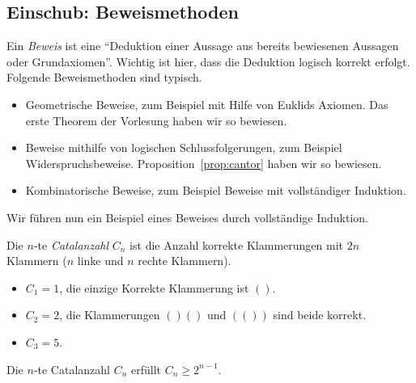 \documentclass[../main.tex]{subfiles}
\begin{document}
\subsection*{Einschub: Beweismethoden}
Ein \emph{Beweis} ist eine ``Deduktion einer Aussage
aus bereits bewiesenen Aussagen oder Grundaxiomen''.
Wichtig ist hier, dass die Deduktion logisch korrekt erfolgt.
Folgende Beweismethoden sind typisch.
  \begin{itemize}
    \item Geometrische Beweise, zum Beispiel mit Hilfe von Euklids Axiomen.
      Das erste Theorem der Vorlesung haben wir so bewiesen.
    \item Beweise mithilfe von logischen Schlussfolgerungen,
      zum Beispiel Widerspruchsbeweise.
      Proposition~\ref{prop:cantor} haben wir so bewiesen.
    \item Kombinatorische Beweise, zum Beispiel
      Beweise mit vollständiger Induktion.
  \end{itemize}


Wir führen nun ein Beispiel eines Beweises durch vollständige Induktion.
\begin{definition}
  Die $n$-te \emph{Catalanzahl} $C_{n}$ ist die Anzahl korrekte
  Klammerungen mit $2n$ Klammern ($n$ linke und $n$ rechte Klammern).
\end{definition}

\begin{examples}
  \leavevmode
  \begin{itemize}
    \item
        $C_{1} = 1$, die einzige Korrekte Klammerung ist $()$.
    \item
      $C_{2} = 2$, die Klammerungen $()()$ und $(())$ sind beide korrekt.
    \item $C_{3} = 5$.
  \end{itemize}
\end{examples}

\begin{claim}
  Die $n$-te Catalanzahl $C_{n}$ erfüllt $C_{n} \geq 2^{n-1}$.
\end{claim}
\end{document}

